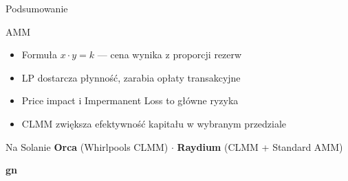 \begin{frame}{Podsumowanie}
  \begin{block}{AMM}
    \begin{itemize}
      \item Formuła $x \cdot y = k$ --- cena wynika z proporcji rezerw
      \item LP dostarcza płynność, zarabia opłaty transakcyjne
      \item Price impact i Impermanent Loss to główne ryzyka
      \item CLMM zwiększa efektywność kapitału w wybranym przedziale
    \end{itemize}
  \end{block}
  \vspace{0.4cm}
  \begin{exampleblock}{Na Solanie}
    \textbf{Orca} (Whirlpools CLMM) \quad $\cdot$ \quad \textbf{Raydium} (CLMM + Standard AMM)
  \end{exampleblock}
\end{frame}

\begin{frame}[plain]
  \begin{center}
    \vfill
    {\Huge\bfseries\color{stplwhite} gn}
    \vfill
  \end{center}
\end{frame}


